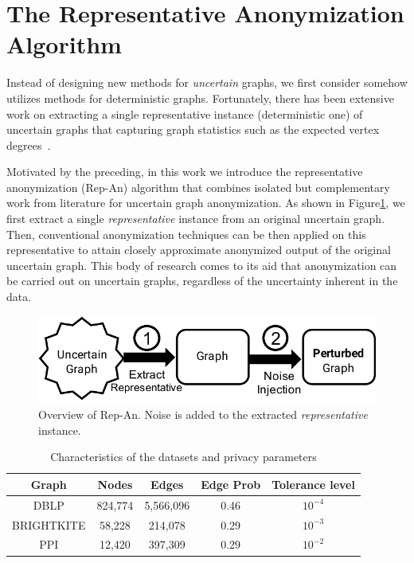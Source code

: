 \section{The Representative Anonymization Algorithm}
\label{sec:repOB}
Instead of designing new methods for \emph{uncertain} graphs, we first consider somehow utilizes methods for deterministic graphs. Fortunately, there has been extensive work on extracting a single representative instance (deterministic one) of uncertain graphs that capturing graph statistics such as the expected vertex degrees~\cite{Parchas_Gullo_Papadias_Bonchi_2014}.  

Motivated by the preceding, in this work we introduce the representative anonymization (Rep-An) algorithm that combines isolated but complementary work from literature for uncertain graph anonymization. As shown in Figure\ref{fig:repOB}, we first extract a single \emph{representative} instance from an original uncertain graph. Then, conventional anonymization techniques can be then applied on this representative to attain closely approximate anonymized output of the original uncertain graph. This body of research comes to its aid that anonymization can be carried out on uncertain graphs, regardless of the uncertainty inherent in the data.

\begin{figure}[t]
  \vspace{-1em}
    \captionsetup{margin=0cm}
    \centering  
        \includegraphics[width=0.95\columnwidth]{AddFigure/repOB.pdf}
        \vspace{-0.7em}
      \caption{Overview of Rep-An. Noise is added to the extracted \emph{representative} instance.}
    \label{fig:repOB}
    \vspace{-0.5em}
\end{figure}

\begin{table}[t]
    \centering
        \caption{Characteristics of the datasets and privacy parameters}
        \begin{tabular}{|c|c|c|c||c|}
        \hline 
        Graph    & Nodes    & Edges    &Edge Prob    & Tolerance level\\
        \hline  
        DBLP     &824,774   &5,566,096 & 0.46        & $10^{-4}$\\
        \small{BRIGHTKITE} &58,228   & 214,078 &0.29 &$10^{-3}$ \\
        PPI      &12,420   & 397,309  & 0.29         &$10^{-2}$\\
        \hline
        \end{tabular}
        \label{tab:dataset}
\end{table}

